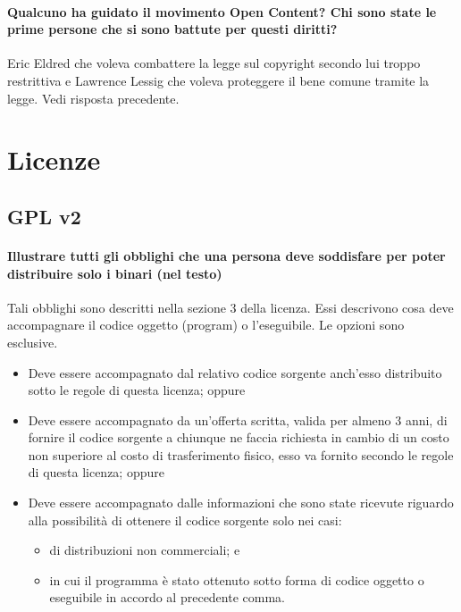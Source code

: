 \documentclass[a4paper]{article}
\begin{document}
		\paragraph{Qualcuno ha guidato il movimento Open Content? Chi sono state le prime persone che si sono battute per questi diritti?}
		Eric Eldred che voleva combattere la legge sul copyright secondo lui troppo restrittiva e Lawrence Lessig che voleva proteggere il bene comune tramite la legge. Vedi risposta precedente.
		
		
	\section{Licenze}
	
		\subsection{GPL v2}
		
			\paragraph{Illustrare tutti gli obblighi che una persona deve soddisfare per poter distribuire solo i binari (nel testo)}
			Tali obblighi sono descritti nella sezione 3 della licenza. Essi descrivono cosa deve accompagnare il codice oggetto (program) o l'eseguibile. Le opzioni sono esclusive.
			\begin{itemize}
				\item Deve essere accompagnato dal relativo codice sorgente anch'esso distribuito sotto le regole di questa licenza; oppure
				\item Deve essere accompagnato da un'offerta scritta, valida per almeno 3 anni, di fornire il codice sorgente a chiunque ne faccia richiesta in cambio di un costo non superiore al costo di trasferimento fisico, esso va fornito secondo le regole di questa licenza; oppure
				\item Deve essere accompagnato dalle informazioni che sono state ricevute riguardo alla possibilità di ottenere il codice sorgente solo nei casi:
				\begin{itemize}
					\item di distribuzioni non commerciali; e
					\item in cui il programma è stato ottenuto sotto forma di codice oggetto o eseguibile in accordo al precedente comma.
				\end{itemize}
			\end{itemize}
		
\end{document}
